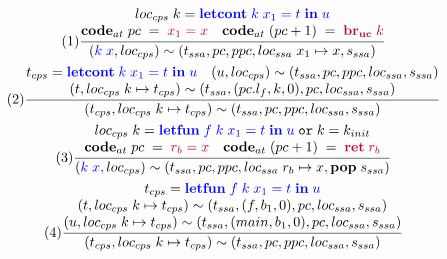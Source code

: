 \begin{figure}[htbp]
    \centering
    \setlength{\jot}{10pt}
    \begin{gather*}
        \tag{1} \displaystyle{\frac{\begin{matrix}
            loc_{cps}\; k = \textcolor{blue}{\mathbf{letcont}\; k\; x_1=t\; \mathbf{in}\; u}\\
            \mathbf{code}_{at}\; pc\; =\; \textcolor{purple}{x_1 = x}\quad
            \mathbf{code}_{at}\; (pc+1)\; =\; \textcolor{purple}{\mathbf{br_{uc}}\; k} \end{matrix}}
            {(\textcolor{blue}{k\; x},loc_{cps})\sim (t_{ssa},pc,ppc,loc_{ssa}\; x_1\mapsto x,s_{ssa})}}  \\
        \tag{2} \displaystyle{\frac{\begin{matrix}
            t_{cps} = \textcolor{blue}{\mathbf{letcont}\; k\; x_1=t\; \mathbf{in}\; u}\quad
            (u,loc_{cps})\sim (t_{ssa},pc,ppc,loc_{ssa},s_{ssa}) \\
            (t,loc_{cps}\; k\mapsto t_{cps})\sim (t_{ssa},(pc.l_f,k,0),pc,loc_{ssa},s_{ssa})\end{matrix}}
            {(t_{cps},loc_{cps}\; k\mapsto t_{cps})\sim (t_{ssa},pc,ppc,loc_{ssa},s_{ssa})}} \\
        \tag{3} \displaystyle{\frac{\begin{matrix}
            loc_{cps}\; k = \textcolor{blue}{\mathbf{letfun}\; f\; k\; x_1=t\; \mathbf{in}\; u}\;
            \mathtt{or}\; k=k_{init}\\
            \mathbf{code}_{at}\; pc\; =\; \textcolor{purple}{r_b = x}\quad 
            \mathbf{code}_{at}\; (pc+1)\; =\; \textcolor{purple}{\mathbf{ret}\; r_b} \end{matrix}}
            {(\textcolor{blue}{k\; x},loc_{cps})\sim (t_{ssa},pc,ppc,loc_{ssa}\; r_b\mapsto x,\mathbf{pop}\; s_{ssa})}}  \\
        \tag{4} \displaystyle{\frac{\begin{matrix}
            t_{cps} = \textcolor{blue}{\mathbf{letfun}\; f\; k\; x_1=t\; \mathbf{in}\; u} \\
            (t,loc_{cps}\; k\mapsto t_{cps})\sim (t_{ssa},(f,b_1,0),pc,loc_{ssa},s_{ssa}) \\
            (u,loc_{cps}\; k\mapsto t_{cps})\sim (t_{ssa},(main,b_1,0),pc,loc_{ssa},s_{ssa})\end{matrix}}
            {(t_{cps},loc_{cps}\; k\mapsto t_{cps})\sim (t_{ssa},pc,ppc,loc_{ssa},s_{ssa})}} \\

\end{gather*}
\end{figure}
